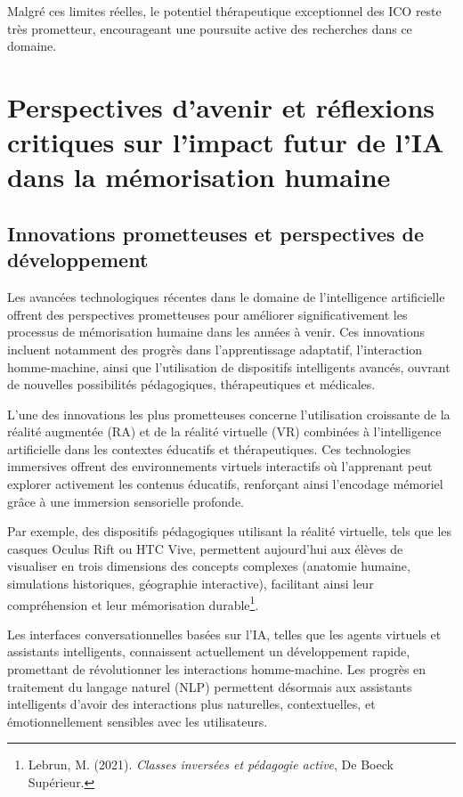 \documentclass[11pt,a4paper]{report}
\begin{document}
Malgré ces limites réelles, le potentiel thérapeutique exceptionnel des ICO reste très prometteur, encourageant une poursuite active des recherches dans ce domaine.

\section{Perspectives d’avenir et réflexions critiques sur l’impact futur de l’IA dans la mémorisation humaine}

\subsection{Innovations prometteuses et perspectives de développement}

Les avancées technologiques récentes dans le domaine de l’intelligence artificielle offrent des perspectives prometteuses pour améliorer significativement les processus de mémorisation humaine dans les années à venir. Ces innovations incluent notamment des progrès dans l’apprentissage adaptatif, l’interaction homme-machine, ainsi que l’utilisation de dispositifs intelligents avancés, ouvrant de nouvelles possibilités pédagogiques, thérapeutiques et médicales.

L’une des innovations les plus prometteuses concerne l’utilisation croissante de la réalité augmentée (RA) et de la réalité virtuelle (VR) combinées à l’intelligence artificielle dans les contextes éducatifs et thérapeutiques. Ces technologies immersives offrent des environnements virtuels interactifs où l’apprenant peut explorer activement les contenus éducatifs, renforçant ainsi l’encodage mémoriel grâce à une immersion sensorielle profonde.

Par exemple, des dispositifs pédagogiques utilisant la réalité virtuelle, tels que les casques Oculus Rift ou HTC Vive, permettent aujourd’hui aux élèves de visualiser en trois dimensions des concepts complexes (anatomie humaine, simulations historiques, géographie interactive), facilitant ainsi leur compréhension et leur mémorisation durable\footnote{Lebrun, M. (2021). \textit{Classes inversées et pédagogie active}, De Boeck Supérieur.}.

Les interfaces conversationnelles basées sur l’IA, telles que les agents virtuels et assistants intelligents, connaissent actuellement un développement rapide, promettant de révolutionner les interactions homme-machine. Les progrès en traitement du langage naturel (NLP) permettent désormais aux assistants intelligents d’avoir des interactions plus naturelles, contextuelles, et émotionnellement sensibles avec les utilisateurs.
\end{document}
